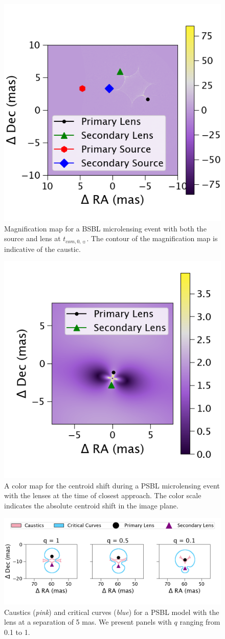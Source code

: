 \documentclass[twocolumn]{aastex701}
\newcommand{\tcomnot}{t_{com,0,\sun}}
\begin{document}
\begin{figure}
    \centering
    \includegraphics[width= 0.5 \textwidth]{figures/magmap.png}
    \caption{Magnification map for a BSBL microlensing event with both the source and lens at $\tcomnot$. The contour of the magnification map is indicative of the caustic. }
    \label{fig:magmaps}
\end{figure}


\begin{figure}
    \centering
    \includegraphics[width= 0.5 \textwidth]{figures/csmap.png}
    \caption{A color map for the centroid shift during a PSBL microlensing event with the lenses at the time of closest approach. The color scale indicates the absolute centroid shift in the image plane.}
    \label{fig:csmap}
\end{figure}


\begin{figure}
    \centering
    \includegraphics[width= \textwidth]{figures/magmaps_varyq.png}
    \caption{Caustics (\emph{pink}) and critical curves (\emph{blue}) for a PSBL model with the lens at a separation of 5 mas. We present panels with $q$ ranging from 0.1 to 1.}
    \label{fig:magmaps_varyq}
\end{figure}
\end{document}
